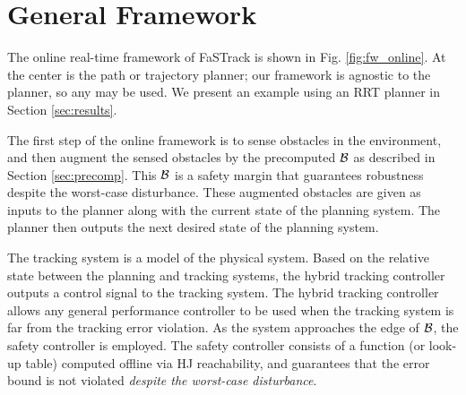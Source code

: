 \section{General Framework \label{sec:framework}}
The online real-time framework of FaSTrack is shown in Fig. \ref{fig:fw_online}. At the center is the path or trajectory planner; our framework is agnostic to the planner, so any may be used. We present an example using an RRT planner in Section \ref{sec:results}.

The first step of the online framework is to sense obstacles in the environment, and then augment the sensed obstacles by the precomputed $\mathcal B$ as described in Section \ref{sec:precomp}. This $\mathcal B$ is a safety margin that guarantees robustness despite the worst-case disturbance. These augmented obstacles are given as inputs to the planner along with the current state of the planning system. The planner then outputs the next desired state of the planning system. 

The tracking system is a model of the physical system. Based on the relative state between the planning and tracking systems, the hybrid tracking controller outputs a control signal to the tracking system. The hybrid tracking controller allows any general performance controller to be used when the tracking system is far from the tracking error violation. As the system approaches the edge of $\mathcal B$, the safety controller is employed. The safety controller consists of a function (or look-up table) computed offline via HJ reachability, and guarantees that the error bound is not violated \textit{despite the worst-case disturbance}.

